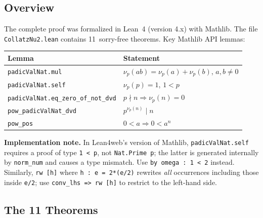 \documentclass[12pt]{article}
\begin{document}
\subsection{Overview}

The complete proof was formalized in Lean~4 (version 4.x) with Mathlib.
The file \texttt{CollatzNu2.lean} contains 11~sorry-free theorems.
Key Mathlib API lemmas:

\begin{center}
\begin{tabular}{ll}
\hline
\textbf{Lemma} & \textbf{Statement} \\
\hline
\texttt{padicValNat.mul} & $\nu_p(ab)=\nu_p(a)+\nu_p(b)$, $a,b\neq 0$ \\
\texttt{padicValNat.self} & $\nu_p(p)=1$, $1<p$ \\
\texttt{padicValNat.eq\_zero\_of\_not\_dvd} & $p\nmid n \Rightarrow \nu_p(n)=0$ \\
\texttt{pow\_padicValNat\_dvd} & $p^{\nu_p(n)}\mid n$ \\
\texttt{pow\_pos} & $0<a \Rightarrow 0<a^n$ \\
\hline
\end{tabular}
\end{center}

\noindent\textbf{Implementation note.}
In Lean4web's version of Mathlib, \texttt{padicValNat.self} requires a
proof of type \texttt{1 < p}, not \texttt{Nat.Prime p}; the latter is
generated internally by \texttt{norm\_num} and causes a type mismatch.
Use \texttt{by omega : 1 < 2} instead.  Similarly, \texttt{rw [h]} where
\texttt{h : e = 2*(e/2)} rewrites \emph{all} occurrences including those
inside \texttt{e/2}; use \texttt{conv\_lhs => rw [h]} to restrict to the
left-hand side.

\subsection{The 11 Theorems}
\end{document}

